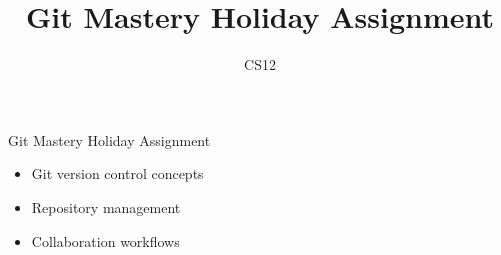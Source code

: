 \documentclass{beamer}
\title{Git Mastery Holiday Assignment}
\author{CS12}
\date{}
\begin{document}
\begin{frame}
    \titlepage
\end{frame}

\begin{frame}{Git Mastery Holiday Assignment}
    \begin{itemize}
        \item Git version control concepts
        \item Repository management
        \item Collaboration workflows
    \end{itemize}
\end{frame}
\end{document}
